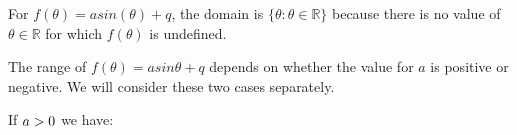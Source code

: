           
          \label{m39414*id85450}For \begin{math}f\left(\theta \right)=asin\left(\theta \right)+q\end{math}, the domain is \begin{math}\{\theta :\theta \in \mathbb{R}\}\end{math} because there is no value of \begin{math}\theta \in \mathbb{R}\end{math} for which \begin{math}f\left(\theta \right)\end{math} is undefined.\par 
          \label{m39414*id85550}The range of \begin{math}f\left(\theta \right)=asin\theta +q\end{math} depends on whether the value for \begin{math}a\end{math} is positive or negative. We will consider these two cases separately.\par 
          \label{m39414*id85596}If \begin{math}a>{}0\end{math} we have:\par 
          \label{m39414*id85612}\nopagebreak\noindent{}
